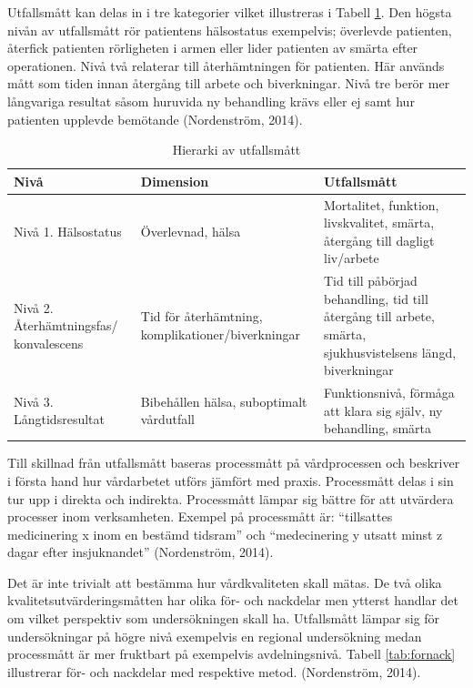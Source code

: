 Utfallsmått kan delas in i tre kategorier vilket illustreras i Tabell \ref{utfallsh}. Den högsta nivån av utfallsmått rör patientens hälsostatus exempelvis; överlevde patienten, återfick patienten rörligheten i armen eller lider patienten av smärta efter operationen. Nivå två relaterar till återhämtningen för patienten. Här används mått som tiden innan återgång till arbete och biverkningar. Nivå tre berör mer långvariga resultat såsom huruvida ny behandling krävs eller ej samt hur patienten upplevde bemötande  (Nordenström, 2014).

\begin{table}[h]
\centering
\caption{Hierarki av utfallsmått}
\label{utfallsh}
\begin{tabular}{|p{3cm}|p{5cm}|p{5cm}|}
\hline
Nivå & Dimension & Utfallsmått \\ \hline
Nivå 1. \newline Hälsostatus & Överlevnad, hälsa & Mortalitet, funktion, livskvalitet, smärta, återgång till dagligt liv/arbete \\ \hline
Nivå 2. \newline Återhämtningsfas/ konvalescens & Tid för återhämtning, komplikationer/biverkningar & Tid till påbörjad behandling, tid till återgång till arbete, smärta, sjukhusvistelsens längd, biverkningar \\ \hline
Nivå 3. \newline Långtidsresultat & Bibehållen hälsa, suboptimalt vårdutfall & Funktionsnivå, förmåga att klara sig själv, ny behandling, smärta \\ \hline
\end{tabular}
\end{table}

Till skillnad från utfallsmått baseras processmått  på vårdprocessen och
beskriver i första hand hur vårdarbetet utförs jämfört med praxis. Processmått delas i sin tur upp i direkta och indirekta. Processmått lämpar sig bättre för att utvärdera processer inom verksamheten. Exempel på processmått är: “tillsattes medicinering x inom en bestämd tidsram” och “medecinering y utsatt minst z dagar efter insjuknandet” (Nordenström, 2014).
 
Det är inte trivialt att bestämma hur vårdkvaliteten skall mätas. De två olika kvalitetsutvärderingsmåtten har olika för- och nackdelar men ytterst handlar det om vilket perspektiv som undersökningen skall ha. Utfallsmått lämpar sig för undersökningar på högre nivå exempelvis en regional undersökning medan processmått är mer fruktbart på exempelvis avdelningsnivå. Tabell \ref{tab:fornack} illustrerar för- och nackdelar med respektive metod. (Nordenström, 2014).

